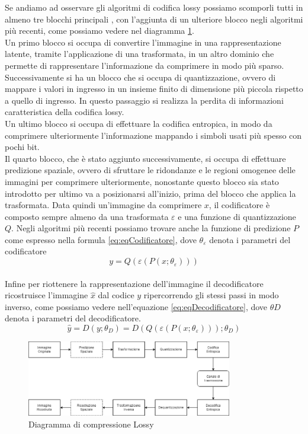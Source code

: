Se andiamo ad osservare gli algoritmi di codifica lossy possiamo scomporli tutti in almeno tre blocchi principali \cite{sadeeq2021image}, con l’aggiunta di un ulteriore blocco negli algoritmi più recenti, come possiamo vedere nel diagramma \ref{fig:LossyCompressorDiagram}.\\
Un primo blocco si occupa di convertire l’immagine in una rappresentazione latente, tramite l’applicazione di una trasformata, in un altro dominio che permette di rappresentare l’informazione da comprimere in modo più sparso.\\
Successivamente si ha un blocco che si occupa di quantizzazione, ovvero di mappare i valori in ingresso in un insieme finito di dimensione più piccola rispetto a quello di ingresso. In questo passaggio si realizza la perdita di informazioni caratteristica della codifica lossy.\\
Un ultimo blocco si occupa di effettuare la codifica entropica, in modo da comprimere ulteriormente l’informazione mappando i simboli usati più spesso con pochi bit.\\
Il quarto blocco, che è stato aggiunto successivamente, si occupa di effettuare predizione spaziale, ovvero di sfruttare le ridondanze e le regioni omogenee delle immagini per comprimere ulteriormente, nonostante questo blocco sia stato introdotto per ultimo va a posizionarsi all’inizio, prima del blocco che applica la trasformata.
Data quindi un’immagine da comprimere $x$, il codificatore è composto sempre almeno da una trasformata  $\varepsilon$ e una funzione di quantizzazione $Q$. Negli algoritmi più recenti possiamo trovare anche la funzione di predizione $P$ come espresso nella formula \ref{eq:eqCodificatore}, dove $\theta_{\varepsilon}$ denota i parametri del codificatore
\begin{equation}\label{eq:eqCodificatore}
    y = Q(\varepsilon(P(x;\theta_{\varepsilon})))
\end{equation}\\
Infine per riottenere la rappresentazione dell’immagine il decodificatore ricostruisce l’immagine $\hat{x}$ dal codice $y$ ripercorrendo gli stessi passi in modo inverso, come possiamo vedere nell’equazione \ref{eq:eqDecodificatore}, dove $\theta{D}$ denota i parametri del decodificatore. \cite{hu2021learning}\\
\begin{equation}\label{eq:eqDecodificatore}
    \hat{y} = D(y;\theta_{D}) = D(Q(\varepsilon(P(x;\theta_{\varepsilon})));\theta_{D})
\end{equation}

\begin{figure}[t!]
    \centering
    \includegraphics[width=0.8\textwidth]{Immagini/LossyCompressorDiagram.png}
    \caption{Diagramma di compressione Lossy}
    \label{fig:LossyCompressorDiagram}
\end{figure}
